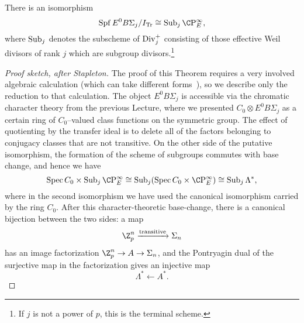 \begin{theorem}
There is an isomorphism \[\Spf E^0 B\Sigma_j / I_{\Tr} \cong \Sub_j \CP^\infty_E,\] where \(\operatorname{Sub}_j\) denotes the subscheme of \(\operatorname{Div}_j^+\) consisting of those effective Weil divisors of rank \(j\) which are subgroup divisors.\footnote{If \(j\) is not a power of \(p\), this is the terminal scheme.}
\end{theorem}
\begin{proof}[Proof sketch, after Stapleton]
The proof of this Theorem requires a very involved algebraic calculation (which can take different forms~\cite{StricklandFiniteSubgps,SchlankStapleton}), so we describe only the reduction to that calculation.  The object \(E^0 B\Sigma_j\) is accessible via the chromatic character theory from the previous Lecture, where we presented \(C_0 \otimes E^0 B\Sigma_j\) as a certain ring of \(C_0\)--valued class functions on the symmetric group.  The effect of quotienting by the transfer ideal is to delete all of the factors belonging to conjugacy classes that are not transitive.  On the other side of the putative isomorphism, the formation of the scheme of subgroups commutes with base change, and hence we have \[\Spec C_0 \times \Sub_j \CP^\infty_E \cong \Sub_j (\Spec C_0 \times \CP^\infty_E) \cong \Sub_j \Lambda^*,\] where in the second isomorphism we have used the canonical isomorphism carried by the ring \(C_0\).  After this character-theoretic base-change, there is a canonical bijection between the two sides: a map \[\Z_p^n \xrightarrow{\mathrm{transitive}} \Sigma_n\] has an image factorization \(\Z_p^n \to A \to \Sigma_n\), and the Pontryagin dual of the surjective map in the factorization gives an injective map \[\Lambda^* \leftarrow A^*.\]


\end{proof}
